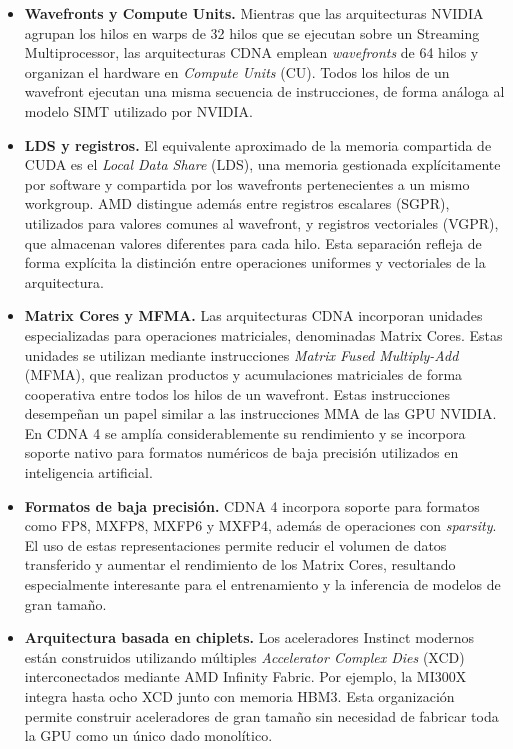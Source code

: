 \begin{itemize}

\item \textbf{Wavefronts y Compute Units.}
Mientras que las arquitecturas NVIDIA agrupan los hilos en warps de 32 hilos que se ejecutan sobre un Streaming Multiprocessor, las arquitecturas CDNA emplean \textit{wavefronts} de 64 hilos y organizan el hardware en \textit{Compute Units} (CU). Todos los hilos de un wavefront ejecutan una misma secuencia de instrucciones, de forma análoga al modelo SIMT utilizado por NVIDIA.

\item \textbf{LDS y registros.}
El equivalente aproximado de la memoria compartida de CUDA es el \textit{Local Data Share} (LDS), una memoria gestionada explícitamente por software y compartida por los wavefronts pertenecientes a un mismo workgroup. AMD distingue además entre registros escalares (SGPR), utilizados para valores comunes al wavefront, y registros vectoriales (VGPR), que almacenan valores diferentes para cada hilo. Esta separación refleja de forma explícita la distinción entre operaciones uniformes y vectoriales de la arquitectura.

\item \textbf{Matrix Cores y MFMA.}
Las arquitecturas CDNA incorporan unidades especializadas para operaciones matriciales, denominadas Matrix Cores. Estas unidades se utilizan mediante instrucciones \textit{Matrix Fused Multiply-Add} (MFMA), que realizan productos y acumulaciones matriciales de forma cooperativa entre todos los hilos de un wavefront. Estas instrucciones desempeñan un papel similar a las instrucciones MMA de las GPU NVIDIA. En CDNA 4 se amplía considerablemente su rendimiento y se incorpora soporte nativo para formatos numéricos de baja precisión utilizados en inteligencia artificial.

\item \textbf{Formatos de baja precisión.}
CDNA 4 incorpora soporte para formatos como FP8, MXFP8, MXFP6 y MXFP4, además de operaciones con \textit{sparsity}. El uso de estas representaciones permite reducir el volumen de datos transferido y aumentar el rendimiento de los Matrix Cores, resultando especialmente interesante para el entrenamiento y la inferencia de modelos de gran tamaño.

\item \textbf{Arquitectura basada en chiplets.}
Los aceleradores Instinct modernos están construidos utilizando múltiples \textit{Accelerator Complex Dies} (XCD) interconectados mediante AMD Infinity Fabric. Por ejemplo, la MI300X integra hasta ocho XCD junto con memoria HBM3. Esta organización permite construir aceleradores de gran tamaño sin necesidad de fabricar toda la GPU como un único dado monolítico.


\end{itemize}
